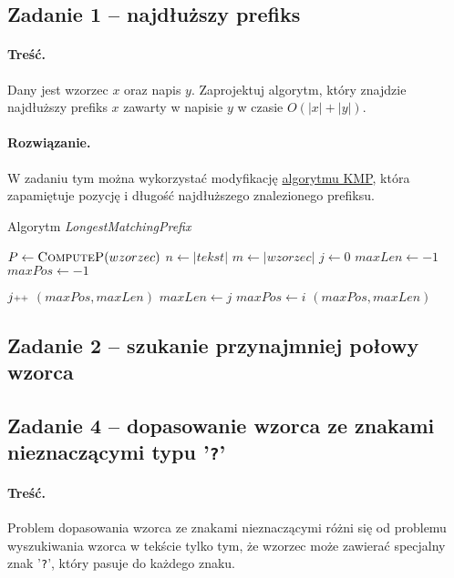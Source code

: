 \subsection{Zadanie 1 -- najdłuższy prefiks}
\paragraph{Treść.}
Dany jest wzorzec $x$ oraz napis $y$. Zaprojektuj algorytm, który znajdzie najdłuższy prefiks $x$ zawarty w napisie $y$ w czasie $O(|x|+|y|)$.

\paragraph{Rozwiązanie.}
W zadaniu tym można wykorzystać modyfikację \hyperref[KMP]{algorytmu KMP}, która zapamiętuje pozycję i długość najdłuższego znalezionego prefiksu.

\begin{algorithm}[H]
	\caption{Algorytm \emph{LongestMatchingPrefix}}
	\begin{algorithmic}[1]
		\State $P \gets \textsc{ComputeP}(wzorzec)$
		\State $n \gets |tekst|$
		\State $m \gets |wzorzec|$
		\State $j \gets 0$
		\State $maxLen\gets-1$
		\State $maxPos\gets-1$ 
		
				\State $j\pp$
			\EndWhile
				\State\Return $(maxPos, maxLen)$
				\State $maxLen\gets j$
				\State $maxPos\gets i$
			\EndIf
		\EndFor
		\State\Return $(maxPos, maxLen)$
		\EndProcedure		
	\end{algorithmic}
\end{algorithm}

\subsection{Zadanie 2 -- szukanie przynajmniej połowy wzorca}

\subsection{Zadanie 4 -- dopasowanie wzorca ze znakami nieznaczącymi typu '\texttt{?}'}
\label{zadanie8.4}
\paragraph{Treść.}
Problem dopasowania wzorca ze znakami nieznaczącymi różni się od problemu wyszukiwania wzorca w tekście tylko tym, że wzorzec może zawierać specjalny znak '\texttt{?}', który pasuje do każdego znaku.

